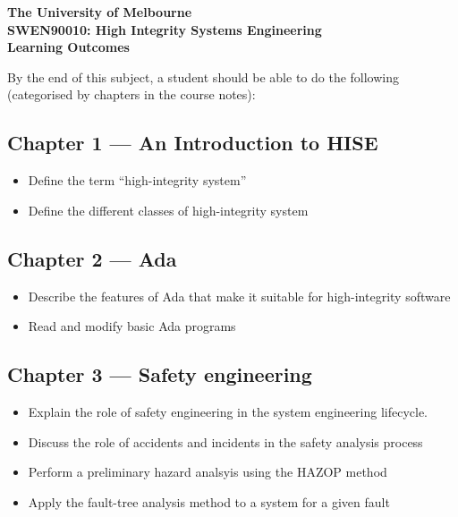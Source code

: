\documentclass[a4paper,11pt]{article}
\begin{document}
\vspace{10ex}
\begin{center}
\textbf{\sc The University of Melbourne}\\[0.5ex]
\textbf{\sc SWEN90010: High Integrity Systems Engineering}\\[1ex]
\textbf{\sc Learning Outcomes}
\end{center}
\vspace{5ex}

\noindent
By the end of this subject, a student should be able to do
the following (categorised by chapters in the course notes):

\subsection*{Chapter 1 --- An Introduction to HISE}

\begin{itemize}
 \item Define the term ``high-integrity system''
 \item Define the different classes of high-integrity system
\end{itemize}

\subsection*{Chapter 2 --- Ada}


\begin{itemize}
 \item Describe the features of Ada that make it suitable for high-integrity software
 \item Read and modify basic Ada programs
\end{itemize}

\subsection*{Chapter 3 --- Safety engineering}

\begin{itemize}
 \item Explain the role of safety engineering in the system engineering lifecycle.
 \item Discuss the role of accidents and incidents in the safety analysis process
 \item Perform a preliminary hazard analsyis using the HAZOP method
 \item Apply the fault-tree analysis method to a system for a given fault
\end{itemize}
\end{document}

